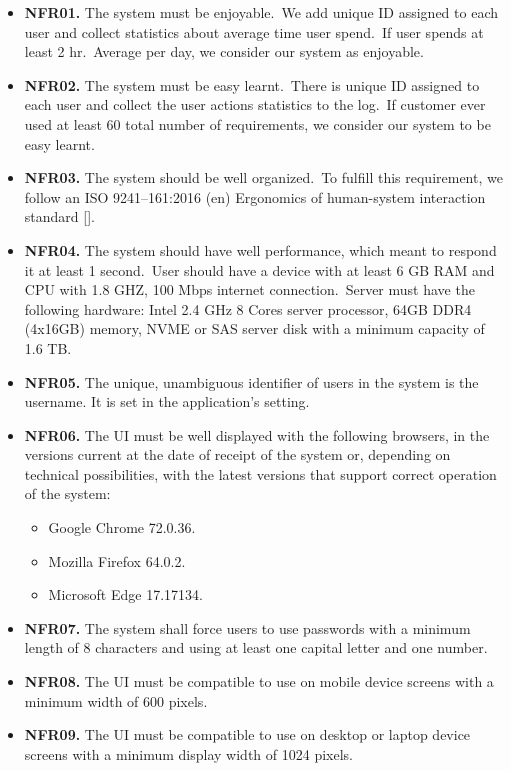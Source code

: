 \begin{itemize}
    \item \textbf{NFR01.} The system must be enjoyable.\ We add unique ID assigned to each user and
    collect statistics about average time user spend.\ If user spends at least 2 hr.\ Average
    per day, we consider our system as enjoyable.
    \item \textbf{NFR02.} The system must be easy learnt.\ There is unique ID assigned to each user and
    collect the user actions statistics to the log.\ If customer ever used at least 60%
    total number of requirements, we consider our system to be easy learnt.
    \item \textbf{NFR03.} The system should be well organized.\ To fulfill this requirement, we follow an
    ISO 9241--161:2016 (en) Ergonomics of human-system interaction standard [\cite{iso2010ergonomics}].
    \item \textbf{NFR04.} The system should have well performance, which meant to respond it at
    least 1 second.\ User should have a device with at least 6 GB RAM and CPU with 1.8
    GHZ, 100 Mbps internet connection.\ Server must have the following hardware: Intel
    2.4 GHz 8 Cores server processor, 64GB DDR4 (4x16GB) memory, NVME or SAS
    server disk with a minimum capacity of 1.6 TB\@.
    \item \textbf{NFR05.} The unique, unambiguous identifier of users in the system is the username.
    It is set in the application’s setting.
    \item \textbf{NFR06.} The UI must be well displayed with the following browsers, in the versions
    current at the date of receipt of the system or, depending on technical possibilities,
    with the latest versions that support correct operation of the system:
    \begin{itemize}
        \item Google Chrome 72.0.36.
        \item Mozilla Firefox 64.0.2.
        \item Microsoft Edge 17.17134.
    \end{itemize}
    \item \textbf{NFR07.} The system shall force users to use passwords with a minimum length of 8
    characters and using at least one capital letter and one number.
    \item \textbf{NFR08.} The UI must be compatible to use on mobile device screens with a minimum
    width of 600 pixels.
    \item \textbf{NFR09.} The UI must be compatible to use on desktop or laptop device screens with a
    minimum display width of 1024 pixels.
\end{itemize}